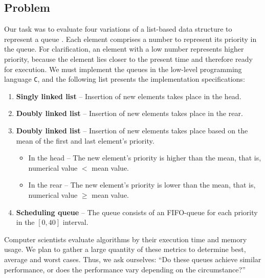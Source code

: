 \documentclass[a4paper,11pt]{kth-mag}
\newcommand*{\skippara}{\par\vspace{\baselineskip} \noindent}
\begin{document}
\subsection{Problem}\label{sec:problem}
Our task was to evaluate four variations of a list-based data structure to represent a queue \cite{Uppgiftl9:online}.
Each element comprises a number to represent its priority in the queue.
For clarification, an element with a low number represents higher priority, because the element lies closer to the present time and therefore ready for execution.
We must implement the queues in the low-level programming language \texttt{C}, and the following list presents the implementation specifications:
\begin{enumerate}
    \item \textbf{Singly linked list} -- Insertion of new elements takes place in the head.
    \item \textbf{Doubly linked list} -- Insertion of new elements takes place in the rear.
    \item \textbf{Doubly linked list} -- Insertion of new elements takes place based on the mean of the first and last element's priority.
        \begin{itemize}
            \item In the head -- The new element's priority is higher than the mean, that is, \\numerical value $<$ mean value.
            \item In the rear -- The new element's priority is lower than the mean, that is,\\numerical value $\ge$ mean value.
        \end{itemize}
    \item \textbf{Scheduling queue} -- The queue consists of an FIFO-queue for each priority in the $[0,40]$ interval.
\end{enumerate}

\skippara
Computer scientists evaluate algorithms by their execution time and memory usage.
We plan to gather a large quantity of these metrics to determine best, average and worst cases.
Thus, we ask ourselves: ``Do these queues achieve similar performance, or does the performance vary depending on the circumstance?''


\clearpage
\end{document}

